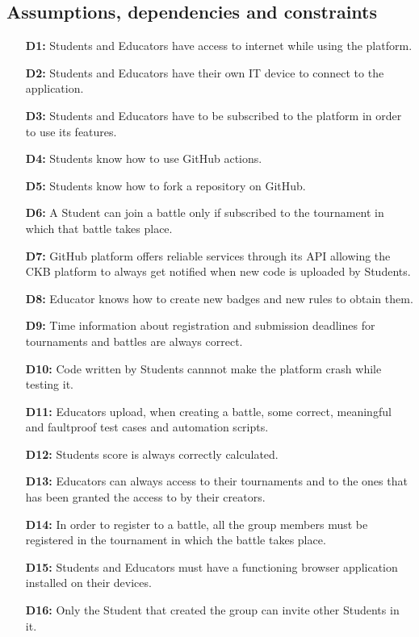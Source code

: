 \documentclass{article}
\begin{document}
{%
\newpage

\subsection{Assumptions, dependencies and constraints}
\begin{itemize}
    \item[\textbf{D1:}] Students and Educators have access to internet while using the platform.
    \item[\textbf{D2:}] Students and Educators have their own IT device to connect to the application.
    \item[\textbf{D3:}] Students and Educators have to be subscribed to the platform in order to use its features.
    \item[\textbf{D4:}] Students know how to use GitHub actions.
    \item[\textbf{D5:}] Students know how to fork a repository on GitHub.
    \item[\textbf{D6:}] A Student can join a battle only if subscribed to the tournament in which that battle takes place.
    \item[\textbf{D7:}] GitHub platform offers reliable services through its API allowing the CKB platform to always get notified when new code is uploaded by Students.
    \item[\textbf{D8:}] Educator knows how to create new badges and new rules to obtain them.
    \item[\textbf{D9:}] Time information about registration and submission deadlines for tournaments and battles are always correct.
    \item[\textbf{D10:}] Code written by Students cannnot make the platform crash while testing it.
    \item[\textbf{D11:}] Educators upload, when creating a battle, some correct, meaningful and faultproof test cases and automation scripts.
    \item[\textbf{D12:}] Students score is always correctly calculated.
    \item[\textbf{D13:}] Educators can always access to their tournaments and to the ones that has been granted the access to
    by their creators.
    \item[\textbf{D14:}] In order to register to a battle, all the group members must be registered in the tournament
          in which the battle takes place.
    \item[\textbf{D15:}] Students and Educators must have a functioning browser application installed on their devices.
    \item[\textbf{D16:}] Only the Student that created the group can invite other Students in it.
\end{itemize}


}
\end{document}
